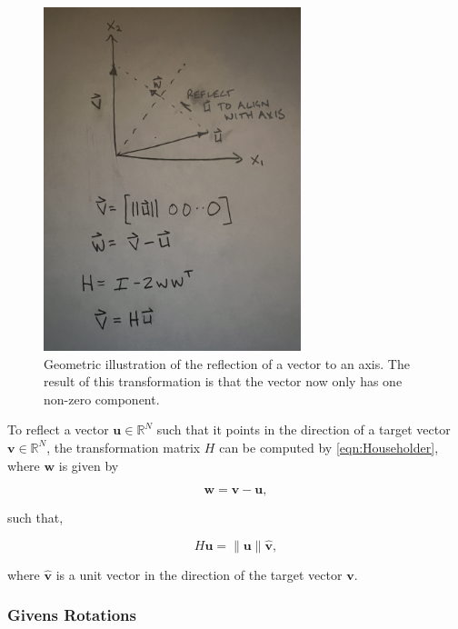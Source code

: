 \documentclass{article}
\begin{document}
\begin{figure}[h]
\centering
\includegraphics[width=75mm, angle=-90]{Householder2}
\caption{Geometric illustration of the reflection of a vector to an axis. The result of this transformation is that the vector now only has one non-zero component.}
\end{figure}

To reflect a vector $\mathbf{u}\in\mathbb{R}^N$ such that it points in the direction of a target vector $\mathbf{v}\in\mathbb{R}^N$, the transformation matrix $H$ can be computed by \eqref{eqn:Householder}, where $\mathbf{w}$ is given by

\begin{equation}
	\label{eqn:normal}
\mathbf{w} = \mathbf{v} - \mathbf{u},
\end{equation}

such that,

\begin{equation}
H\mathbf{u} = \|\mathbf{u}\|\mathbf{\hat{v}},
\end{equation}

where $\mathbf{\hat{v}}$ is a unit vector in the direction of the target vector $\mathbf{v}$.

\subsubsection{Givens Rotations}
\end{document}
